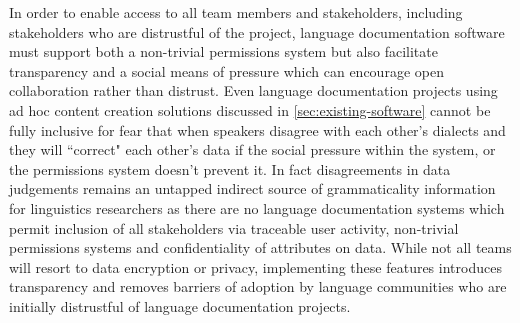 \documentclass[11pt]{article}
\begin{document}
In order to enable access to all team members and stakeholders, including
stakeholders who are distrustful of the project, language documentation
software must support both a non-trivial permissions system but also facilitate
transparency and a social means of pressure which can encourage open
collaboration rather than distrust.  Even language documentation projects using
ad hoc content creation solutions discussed in \autoref{sec:existing-software} cannot be fully inclusive for fear that when
speakers disagree with each other's dialects and they will ``correct"  each
other's data if the social pressure within the system, or the permissions system
doesn't prevent it.  In fact disagreements in data judgements remains an
untapped  indirect source of grammaticality information for linguistics researchers as there are no language documentation
systems which permit inclusion of all stakeholders via traceable user activity, non-trivial permissions systems
and confidentiality of attributes on data. While not all teams will resort to data encryption or privacy, implementing these features introduces transparency and removes barriers of adoption by language communities who are initially distrustful of language documentation projects. 





\end{document}
